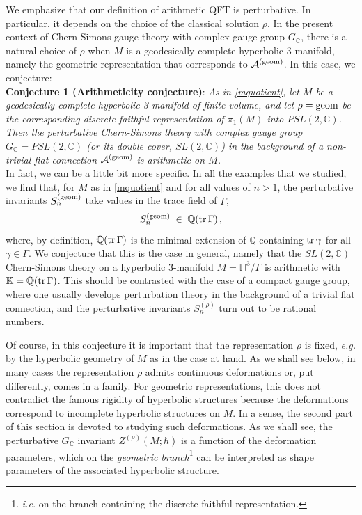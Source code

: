 \documentclass[hyper]{JHEP3}
\def\tr{{\rm tr\,}}
\def\CA {{\cal A}}
\newcommand{\C}{{\mathbb{C}}}
\newcommand{\IH}{{\mathbb{H}}}
\newcommand\be{\begin{equation}}
\newcommand\ee{\end{equation}}
\begin{document}
We emphasize that our definition of arithmetic QFT is perturbative.
In particular, it depends on the choice of the classical solution $\rho$.
In the present context of Chern-Simons gauge theory with complex
gauge group $G_{\C}$, there is a natural choice of $\rho$
when $M$ is a geodesically complete hyperbolic 3-manifold,
namely the geometric representation that corresponds to $\CA^{({\rm geom})}$.
In this case, we conjecture:\\

\noindent \textbf{Conjecture 1 (Arithmeticity conjecture)}: {\it As in \eqref{mquotient}, let $M$ be a geodesically
complete hyperbolic 3-manifold of finite volume, and let $\rho = {\rm geom}$
be the corresponding discrete faithful representation of $\pi_1 (M)$ into $PSL(2,\C)$.
Then the perturbative Chern-Simons theory with complex gauge group $G_{\C} = PSL(2,\C)$
(or its double cover, $SL(2,\C)$)
in the background of a non-trivial flat connection $\CA^{({\rm geom})}$ is arithmetic on $M$.} \\

In fact, we can be a little bit more specific.
In all the examples that we studied, we find that, for $M$ as in \eqref{mquotient}
and for all values of $n>1$, the perturbative invariants $S_n^{({\rm geom})}$
take values in the trace field of $\Gamma$,
\be
S_n^{({\rm geom})} \;\in\; \mathbb{Q} (\tr \Gamma)\,,
\label{snintrace}
\ee
where, by definition, $\mathbb{Q} (\tr \Gamma)$ is
the minimal extension of $\mathbb{Q}$ containing $\tr \gamma$ for all $\gamma \in \Gamma$.
We conjecture that this is the case in general, namely that
the $SL(2,\C)$ Chern-Simons theory on a hyperbolic 3-manifold $M = \IH^3 / \Gamma$
is arithmetic with $\mathbb{K} = \mathbb{Q} (\tr \Gamma)$.
This should be contrasted with the case of a compact gauge group,
where one usually develops perturbation theory in the background
of a trivial flat connection, and the perturbative invariants $S_n^{(\rho)}$
turn out to be rational numbers.

Of course, in this conjecture it is important that the representation $\rho$
is fixed, {\it e.g.} by the hyperbolic geometry of $M$ as in the case at hand.
As we shall see below, in many cases the representation $\rho$ admits continuous
deformations or, put differently, comes in a family.
For geometric representations, this does not contradict the famous rigidity of
hyperbolic structures because the deformations correspond
to incomplete hyperbolic structures on $M$.
In a sense, the second part of this section is devoted to studying
such deformations. As we shall see, the perturbative $G_{\C}$ invariant
$Z^{(\rho)} (M;\hbar)$ is a function of the deformation parameters,
which on the {\it geometric branch}\footnote{{\it i.e.} on the branch containing
the discrete faithful representation.} can be interpreted as shape parameters of
the associated hyperbolic structure.
\end{document}
